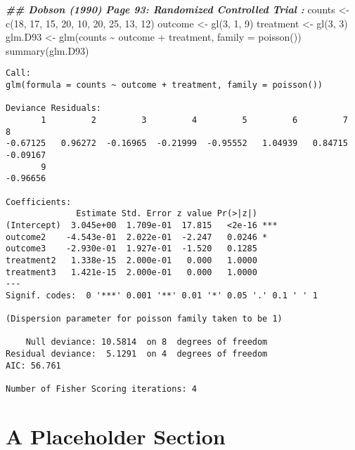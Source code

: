 \documentclass[letterpaper,inpress]{jdsart}
\newenvironment{Shaded}{\begin{snugshade}}{\end{snugshade}}
\newcommand{\AttributeTok}[1]{\textcolor[rgb]{0.77,0.63,0.00}{#1}}
\newcommand{\DecValTok}[1]{\textcolor[rgb]{0.00,0.00,0.81}{#1}}
\newcommand{\DocumentationTok}[1]{\textcolor[rgb]{0.56,0.35,0.01}{\textbf{\textit{#1}}}}
\newcommand{\FunctionTok}[1]{\textcolor[rgb]{0.00,0.00,0.00}{#1}}
\newcommand{\NormalTok}[1]{#1}
\newcommand{\OtherTok}[1]{\textcolor[rgb]{0.56,0.35,0.01}{#1}}
\newcommand{\SpecialCharTok}[1]{\textcolor[rgb]{0.00,0.00,0.00}{#1}}
\begin{document}
\begin{Shaded}
\begin{Highlighting}[]
\DocumentationTok{\#\# Dobson (1990) Page 93: Randomized Controlled Trial :}
\NormalTok{counts }\OtherTok{\textless{}{-}} \FunctionTok{c}\NormalTok{(}\DecValTok{18}\NormalTok{, }\DecValTok{17}\NormalTok{, }\DecValTok{15}\NormalTok{, }\DecValTok{20}\NormalTok{, }\DecValTok{10}\NormalTok{, }\DecValTok{20}\NormalTok{, }\DecValTok{25}\NormalTok{, }\DecValTok{13}\NormalTok{, }\DecValTok{12}\NormalTok{)}
\NormalTok{outcome }\OtherTok{\textless{}{-}} \FunctionTok{gl}\NormalTok{(}\DecValTok{3}\NormalTok{, }\DecValTok{1}\NormalTok{, }\DecValTok{9}\NormalTok{)}
\NormalTok{treatment }\OtherTok{\textless{}{-}} \FunctionTok{gl}\NormalTok{(}\DecValTok{3}\NormalTok{, }\DecValTok{3}\NormalTok{)}
\NormalTok{glm.D93 }\OtherTok{\textless{}{-}} \FunctionTok{glm}\NormalTok{(counts }\SpecialCharTok{\textasciitilde{}}\NormalTok{ outcome }\SpecialCharTok{+}\NormalTok{ treatment, }\AttributeTok{family =} \FunctionTok{poisson}\NormalTok{())}
\FunctionTok{summary}\NormalTok{(glm.D93)}
\end{Highlighting}
\end{Shaded}

\begin{verbatim}
Call:
glm(formula = counts ~ outcome + treatment, family = poisson())

Deviance Residuals: 
       1         2         3         4         5         6         7         8  
-0.67125   0.96272  -0.16965  -0.21999  -0.95552   1.04939   0.84715  -0.09167  
       9  
-0.96656  

Coefficients:
              Estimate Std. Error z value Pr(>|z|)    
(Intercept)  3.045e+00  1.709e-01  17.815   <2e-16 ***
outcome2    -4.543e-01  2.022e-01  -2.247   0.0246 *  
outcome3    -2.930e-01  1.927e-01  -1.520   0.1285    
treatment2   1.338e-15  2.000e-01   0.000   1.0000    
treatment3   1.421e-15  2.000e-01   0.000   1.0000    
---
Signif. codes:  0 '***' 0.001 '**' 0.01 '*' 0.05 '.' 0.1 ' ' 1

(Dispersion parameter for poisson family taken to be 1)

    Null deviance: 10.5814  on 8  degrees of freedom
Residual deviance:  5.1291  on 4  degrees of freedom
AIC: 56.761

Number of Fisher Scoring iterations: 4
\end{verbatim}

\hypertarget{a-placeholder-section}{%
\section{A Placeholder Section}\label{a-placeholder-section}}
\end{document}
